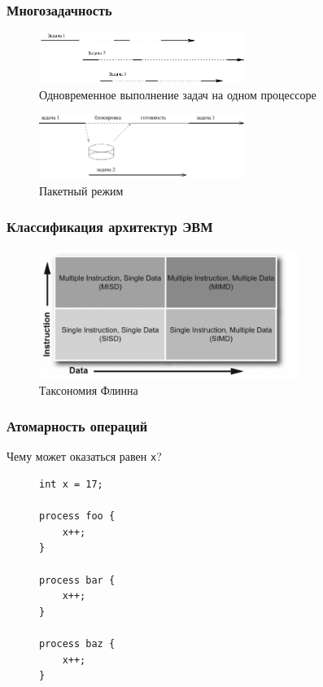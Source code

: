 \documentclass[aspectratio=169, pdf, 8pt, unicode]{beamer}
\begin{document}
\begin{frame}[fragile]
\frametitle{Многозадачность}
\begin{figure}[H]
      \centering
      \includegraphics[width=0.6\textwidth]{fig/multitasking.png}
      \caption{Одновременное выполнение задач на одном процессоре}
\end{figure}
\begin{figure}[H]
      \centering
      \includegraphics[width=0.6\textwidth]{fig/multitasking_io.png}
      \caption{Пакетный режим}
\end{figure}
\end{frame}

\begin{frame}[fragile]
\frametitle{Классификация архитектур ЭВМ}
\begin{figure}[H]
      \centering
      \includegraphics[width=0.75\textwidth]{fig/flinn.png}
      \caption{Таксономия Флинна}
\end{figure}
\end{frame}

\begin{frame}[fragile]
\frametitle{Атомарность операций}
Чему может оказаться равен \texttt{x}?
\begin{figure}[H]
\centering
\begin{BVerbatim}
int x = 17;

process foo { 
    x++;
}

process bar { 
    x++;
}

process baz { 
    x++;
}
\end{BVerbatim}
\end{figure}
\end{frame}
\end{document}
